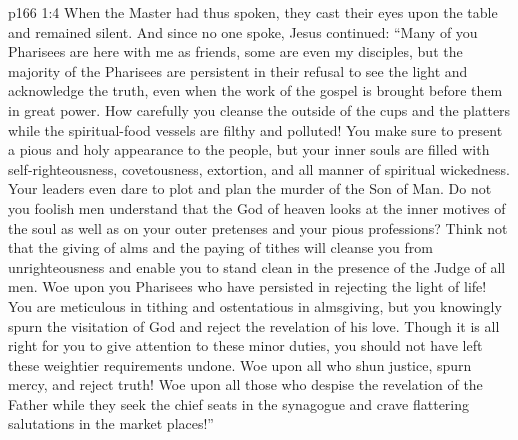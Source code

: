 \vs p166 1:4 When the Master had thus spoken, they cast their eyes upon the table and remained silent. And since no one spoke, Jesus continued: \textcolor{ubdarkred}{“Many of you Pharisees are here with me as friends, some are even my disciples, but the majority of the Pharisees are persistent in their refusal to see the light and acknowledge the truth, even when the work of the gospel is brought before them in great power. How carefully you cleanse the outside of the cups and the platters while the spiritual\hyp{}food vessels are filthy and polluted! You make sure to present a pious and holy appearance to the people, but your inner souls are filled with self\hyp{}righteousness, covetousness, extortion, and all manner of spiritual wickedness. Your leaders even dare to plot and plan the murder of the Son of Man. Do not you foolish men understand that the God of heaven looks at the inner motives of the soul as well as on your outer pretenses and your pious professions? Think not that the giving of alms and the paying of tithes will cleanse you from unrighteousness and enable you to stand clean in the presence of the Judge of all men. Woe upon you Pharisees who have persisted in rejecting the light of life! You are meticulous in tithing and ostentatious in almsgiving, but you knowingly spurn the visitation of God and reject the revelation of his love. Though it is all right for you to give attention to these minor duties, you should not have left these weightier requirements undone. Woe upon all who shun justice, spurn mercy, and reject truth! Woe upon all those who despise the revelation of the Father while they seek the chief seats in the synagogue and crave flattering salutations in the market places!”}\plusone
